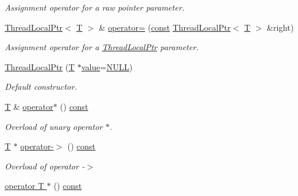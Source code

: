 \begin{DoxyCompactItemize}
\begin{DoxyCompactList}\small\item\em Assignment operator for a raw pointer parameter. \end{DoxyCompactList}\item 
\hyperlink{classsf_1_1_thread_local_ptr}{Thread\-Local\-Ptr}$<$ \hyperlink{curses_8priv_8h_a5ef253115820acf7d27f3c5c3b02a0f0}{T} $>$ \& \hyperlink{classsf_1_1_thread_local_ptr_a6792a6a808af06f0d13e3ceecf2fc947}{operator=} (\hyperlink{term__entry_8h_a57bd63ce7f9a353488880e3de6692d5a}{const} \hyperlink{classsf_1_1_thread_local_ptr}{Thread\-Local\-Ptr}$<$ \hyperlink{curses_8priv_8h_a5ef253115820acf7d27f3c5c3b02a0f0}{T} $>$ \&right)
\begin{DoxyCompactList}\small\item\em Assignment operator for a \hyperlink{classsf_1_1_thread_local_ptr}{Thread\-Local\-Ptr} parameter. \end{DoxyCompactList}\item 
\hyperlink{classsf_1_1_thread_local_ptr_a8c678211d7828d2a8c41cb534422d649}{Thread\-Local\-Ptr} (\hyperlink{curses_8priv_8h_a5ef253115820acf7d27f3c5c3b02a0f0}{T} $\ast$\hyperlink{curses_8priv_8h_a3772851912abe3ccbff5c659ff71f2ff}{value}=\hyperlink{internal_8h_a070d2ce7b6bb7e5c05602aa8c308d0c4}{N\-U\-L\-L})
\begin{DoxyCompactList}\small\item\em Default constructor. \end{DoxyCompactList}\item 
\hyperlink{curses_8priv_8h_a5ef253115820acf7d27f3c5c3b02a0f0}{T} \& \hyperlink{classsf_1_1_thread_local_ptr_a601856258cf668c345b63217a9cd2c07}{operator$\ast$} () \hyperlink{term__entry_8h_a57bd63ce7f9a353488880e3de6692d5a}{const} 
\begin{DoxyCompactList}\small\item\em Overload of unary operator $\ast$. \end{DoxyCompactList}\item 
\hyperlink{curses_8priv_8h_a5ef253115820acf7d27f3c5c3b02a0f0}{T} $\ast$ \hyperlink{classsf_1_1_thread_local_ptr_aecebc50c4c0ed75bcf246707d54c4d4b}{operator-\/$>$} () \hyperlink{term__entry_8h_a57bd63ce7f9a353488880e3de6692d5a}{const} 
\begin{DoxyCompactList}\small\item\em Overload of operator -\/$>$ \end{DoxyCompactList}\item 
\hyperlink{classsf_1_1_thread_local_ptr_ab4a6a341c26b58f0ed3ef86502bd9572}{operator T $\ast$} () \hyperlink{term__entry_8h_a57bd63ce7f9a353488880e3de6692d5a}{const} 

\end{DoxyCompactItemize}
